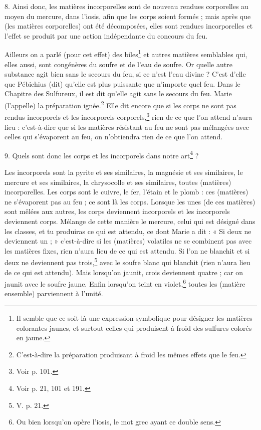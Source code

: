 \documentclass[a4paper, 11pt, oneside, polutonikogreek, french]{article}
\begin{document}
8. Ainsi donc, les matières incorporelles sont de nouveau rendues corporelles au moyen du mercure, dans l'iosis, afin que les corps soient formés ; mais après que (les matières corporelles) ont été décomposées, elles sont rendues incorporelles et l'effet se produit par une action indépendante du concours du feu.

Ailleurs on a parlé (pour cet effet) des biles\footnote{Il semble que ce soit là une expression symbolique pour désigner les matières colorantes jaunes, et surtout celles qui produisent à froid des sulfures colorés en jaune.} et autres matières semblables qui, elles aussi, sont congénères du soufre et de l'eau de soufre. Or quelle autre substance agit bien sans le secours du feu, si ce n'est l'eau divine ? C'est d'elle que Pébichius (dit) qu'elle est plus puissante que n'importe quel feu. Dans le Chapitre des Sulfureux, il est dit qu'elle agit sans le secours du feu. Marie (l'appelle) la préparation ignée.\footnote{C'est-à-dire la préparation produisant à froid les mêmes effets que le feu.} Elle dit encore que si les corps ne sont pas rendus incorporels et les incorporels corporels,\footnote{Voir p. 101.} rien de ce que l'on attend n'aura lieu : c'est-à-dire que si les matières résistant au feu ne sont pas mélangées avec celles qui s'évaporent au feu, on n'obtiendra rien de ce que l'on attend.

9. Quels sont donc les corps et les incorporels dans notre art\footnote{Voir p. 21, 101 et 191.} ?

Les incorporels sont la pyrite et ses similaires, la magnésie et ses similaires, le mercure et ses similaires, la chrysocolle et ses similaires, toutes (matières) incorporelles. Les corps sont le cuivre, le fer, l'étain et le plomb : ces (matières) ne s'évaporent pas au feu ; ce sont là les corps. Lorsque les unes (de ces matières) sont mêlées aux autres, les corps deviennent incorporels et les incorporels deviennent corps. Mélange de cette manière le mercure, celui qui est désigné dans les classes, et tu produiras ce qui est attendu, ce dont Marie a dit : « Si deux ne deviennent un ; » c'est-à-dire si les (matières) volatiles ne se combinent pas avec les matières fixes, rien n'aura lieu de ce qui est attendu. Si l'on ne blanchit et si deux ne deviennent pas trois,\footnote{V. p. 21.} avec le soufre blanc qui blanchit (rien n'aura lieu de ce qui est attendu). Mais lorsqu'on jaunit, crois deviennent quatre ; car on jaunit avec le soufre jaune. Enfin lorsqu'on teint en violet,\footnote{Ou bien lorsqu'on opère l'iosis, le mot grec ayant ce double sens.} toutes les (matière ensemble) parviennent à l'unité.
\end{document}
